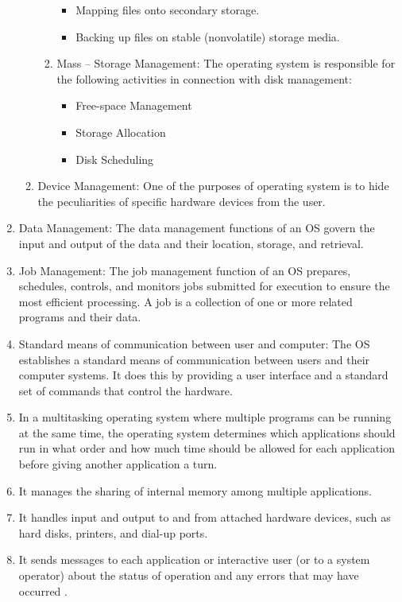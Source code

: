 \documentclass[11pt,a4paper]{article}
\begin{document}
\begin{enumerate}
\begin{enumerate}
\begin{enumerate}
\begin{itemize}
		\item Mapping files onto secondary storage.
		\item Backing up files on stable (nonvolatile) storage media.	
		\end{itemize}
		\item Mass – Storage Management:  The operating system is responsible for the following activities in connection with disk management:
		\begin{itemize}
		\item Free-space Management
		\item Storage Allocation
		\item Disk Scheduling	
		\end{itemize}
		
		\end{enumerate}
		\item Device Management:  One of the purposes of operating system is to hide the peculiarities of specific hardware devices from the user.
		\end{enumerate}
		\item Data Management:  The data management functions of an OS govern the input and output of the data and their location, storage, and retrieval.
		\item Job Management:  The job management function of an OS prepares, schedules, controls, and monitors jobs submitted for execution to ensure the most efficient processing. A job is a collection of one or more related programs and their data.
		\item Standard means of communication between user and computer:  The OS establishes a standard means of communication between users and their computer systems. It does this by providing a user interface and a standard set of commands that control the hardware. 
		\item In a multitasking operating system where multiple programs can be running at the same time, the operating system determines which applications should run in what order and how much time should be allowed for each application before giving another application a turn.
		\item It manages the sharing of internal memory among multiple applications.
		\item It handles input and output to and from attached hardware devices, such as hard disks, printers, and dial-up ports.
		\item It sends messages to each application or interactive user (or to a system operator) about the status of operation and any errors that may have occurred .

\end{enumerate}
\end{document}
